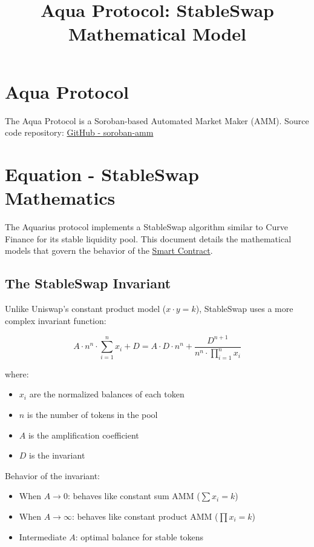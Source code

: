 \documentclass[12pt]{article}
\title{Aqua Protocol: StableSwap Mathematical Model}
\author{}
\date{}
\begin{document}
\maketitle

\section*{Aqua Protocol}

The Aqua Protocol is a Soroban-based Automated Market Maker (AMM). Source code repository: \href{https://github.com/AquaToken/soroban-amm/tree/master}{GitHub - soroban-amm}

\section{Equation - StableSwap Mathematics}

The Aquarius protocol implements a StableSwap algorithm similar to Curve Finance for its stable liquidity pool. This document details the mathematical models that govern the behavior of the \href{https://github.com/AquaToken/soroban-amm/tree/master/liquidity_pool_stableswap}{Smart Contract}.

\subsection{The StableSwap Invariant}

Unlike Uniswap’s constant product model ($x \cdot y = k$), StableSwap uses a more complex invariant function:

\begin{equation}
A \cdot n^n \cdot \sum_{i=1}^{n} x_i + D = A \cdot D \cdot n^n + \frac{D^{n+1}}{n^n \cdot \prod_{i=1}^{n} x_i}
\end{equation}

where:
\begin{itemize}
    \item $x_i$ are the normalized balances of each token
    \item $n$ is the number of tokens in the pool
    \item $A$ is the amplification coefficient
    \item $D$ is the invariant
\end{itemize}

Behavior of the invariant:
\begin{itemize}
    \item When $A \to 0$: behaves like constant sum AMM ($\sum x_i = k$)
    \item When $A \to \infty$: behaves like constant product AMM ($\prod x_i = k$)
    \item Intermediate $A$: optimal balance for stable tokens
\end{itemize}
\end{document}
